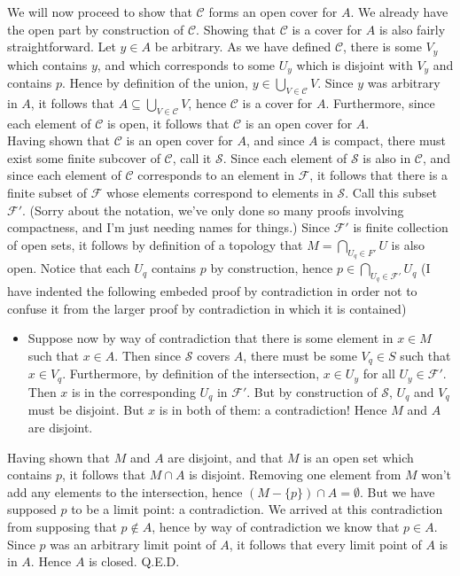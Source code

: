 \documentclass{article}
\begin{document}
We will now proceed to show that $\mathcal{C}$ forms an open cover for $A$. We already have the open part by construction of $\mathcal{C}$. Showing that $\mathcal{C}$ is a cover for $A$ is also fairly straightforward. Let $y\in A$ be arbitrary. As we have defined $\mathcal{C}$, there is some $V_y$ which contains $y$, and which corresponds to some $U_y$ which is disjoint with $V_y$ and contains $p$. Hence by definition of the union, $y\in \bigcup_{V\in \mathcal{C}}V$. Since $y$ was arbitrary in $A$, it follows that $A\subseteq \bigcup_{V\in \mathcal{C}}V$, hence $\mathcal{C}$ is a cover for $A$. Furthermore, since each element of $\mathcal{C}$ is open, it follows that $\mathcal{C}$ is an open cover for $A$.\\

Having shown that $\mathcal{C}$ is an open cover for $A$, and since $A$ is compact, there must exist some finite subcover of $\mathcal{C}$, call it $\mathcal{S}$. Since each element of $\mathcal{S}$ is also in $\mathcal{C}$, and since each element of $\mathcal{C}$ corresponds to an element in $\mathcal{F}$, it follows that there is a finite subset of $\mathcal{F}$ whose elements correspond to elements in $\mathcal{S}$. Call this subset $\mathcal{F}'$. (Sorry about the notation, we've only done so many proofs involving compactness, and I'm just needing names for things.) Since $\mathcal{F}'$ is finite collection of open sets, it follows by definition of a topology that $M = \bigcap_{U_q\in F'}U$ is also open. Notice that each $U_q$ contains $p$ by construction, hence $p\in \bigcap_{U_q\in \mathcal{F}'}U_q$ (I have indented the following embeded proof by contradiction in order not to confuse it from the larger proof by contradiction in which it is contained)
\begin{itemize}
    \item Suppose now by way of contradiction that there is some element in $x\in M$ such that $x\in A$. Then since $\mathcal{S}$ covers $A$, there must be some $ V_q\in S$ such that $x\in V_q$. Furthermore, by definition of the intersection, $x\in U_y$ for all $U_y\in\mathcal{F'}$. Then $x$ is in the corresponding $U_q$ in $\mathcal{F'}$. But by construction of $\mathcal{S}$, $U_q$ and $V_q$ must be disjoint. But $x$ is in both of them: a contradiction! Hence $M$ and $A$ are disjoint.
\end{itemize} 
Having shown that $M$ and $A$ are disjoint, and that $M$ is an open set which contains $p$, it follows that $M\cap A$ is disjoint. Removing one element from $M$ won't add any elements to the intersection, hence $(M - \{p\})\cap A = \emptyset$. But we have supposed $p$ to be a limit point: a contradiction. We arrived at this contradiction from supposing that $p\not\in A$, hence by way of contradiction we know that $p\in A$. Since $p$ was an arbitrary limit point of $A$, it follows that every limit point of $A$ is in $A$. Hence $A$ is closed. Q.E.D.
\end{document}

